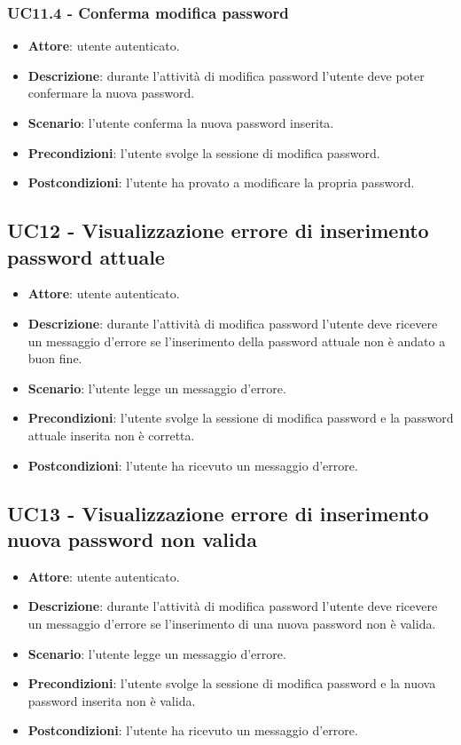\subsubsection{UC11.4 - Conferma modifica password}
\begin{itemize}
    \item \textbf{Attore}: utente autenticato.
    \item \textbf{Descrizione}: durante l'attività di modifica password l'utente deve poter confermare la nuova password.
    \item \textbf{Scenario}: l'utente conferma la nuova password inserita. 
    \item \textbf{Precondizioni}: l'utente svolge la sessione di modifica password.
    \item \textbf{Postcondizioni}: l'utente ha provato a modificare la propria password.
\end{itemize}

\subsection{UC12 - Visualizzazione errore di inserimento password attuale}
\begin{itemize}
    \item \textbf{Attore}: utente autenticato.
    \item \textbf{Descrizione}: durante l'attività di modifica password l'utente deve ricevere un messaggio d'errore se l'inserimento della password attuale non è andato a buon fine.
    \item \textbf{Scenario}: l'utente legge un messaggio d'errore. 
    \item \textbf{Precondizioni}: l'utente svolge la sessione di modifica password e la password attuale inserita non è corretta.
    \item \textbf{Postcondizioni}: l'utente ha ricevuto un messaggio d'errore.
\end{itemize}

\subsection{UC13 - Visualizzazione errore di inserimento nuova password non valida}
\begin{itemize}
    \item \textbf{Attore}: utente autenticato.
    \item \textbf{Descrizione}: durante l'attività di modifica password l'utente deve ricevere un messaggio d'errore se l'inserimento di una nuova password non è valida.
    \item \textbf{Scenario}: l'utente legge un messaggio d'errore. 
    \item \textbf{Precondizioni}: l'utente svolge la sessione di modifica password e la nuova password inserita non è valida.
    \item \textbf{Postcondizioni}: l'utente ha ricevuto un messaggio d'errore.

\end{itemize}

